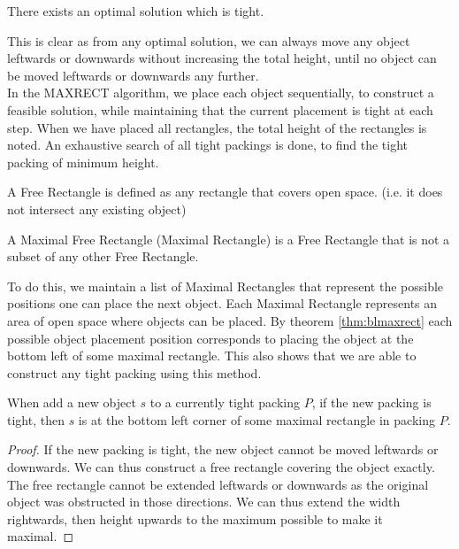 \documentclass{article}
\begin{document}
\begin{thm}
There exists an optimal solution which is tight.
\end{thm}
This is clear as from any optimal solution, we can always move any object leftwards or downwards without increasing the total height, until no object can be moved leftwards or downwards any further.\\

In the MAXRECT algorithm, we place each object sequentially, to construct a feasible solution, while maintaining that the current placement is tight at each step. When we have placed all rectangles, the total height of the rectangles is noted. An exhaustive search of all tight packings is done, to find the tight packing of minimum height.

\begin{defn}
A Free Rectangle is defined as any rectangle that covers open space. (i.e. it does not intersect any existing object)
\end{defn}

\begin{defn}
A Maximal Free Rectangle (Maximal Rectangle) is a Free Rectangle that is not a subset of any other Free Rectangle.
\end{defn}

To do this, we maintain a list of Maximal Rectangles that represent the possible positions one can place the next object. Each Maximal Rectangle represents an area of open space where objects can be placed. By theorem \ref{thm:blmaxrect} each possible object placement position corresponds to placing the object at the bottom left of some maximal rectangle. This also shows that we are able to construct any tight packing using this method.

\begin{thm}
\label{thm:blmaxrect}
When add a new object $s$ to a currently tight packing $P$, if the new packing is tight, then $s$ is at the bottom left corner of some maximal rectangle in packing $P$.
\end{thm}
\begin{proof}
If the new packing is tight, the new object cannot be moved leftwards or downwards. We can thus construct a free rectangle covering the object exactly. The free rectangle cannot be extended leftwards or downwards as the original object was obstructed in those directions. We can thus extend the width rightwards, then height upwards to the maximum possible to make it maximal.
\end{proof}
\end{document}

